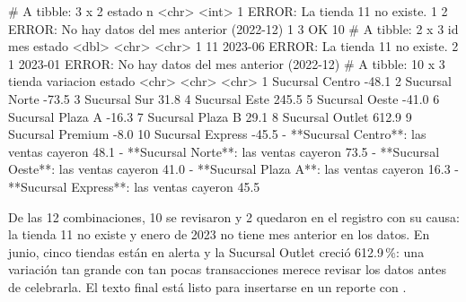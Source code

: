 \begin{rsalida}
# A tibble: 3 x 2
  estado                                             n
  <chr>                                          <int>
1 ERROR: La tienda 11 no existe.                     1
2 ERROR: No hay datos del mes anterior (2022-12)     1
3 OK                                                10
# A tibble: 2 x 3
     id mes     estado                                        
  <dbl> <chr>   <chr>                                         
1    11 2023-06 ERROR: La tienda 11 no existe.                
2     1 2023-01 ERROR: No hay datos del mes anterior (2022-12)
# A tibble: 10 x 3
   tienda           variacion estado            
   <chr>            <chr>     <chr>             
 1 Sucursal Centro  -48.1%
 2 Sucursal Norte   -73.5%
 3 Sucursal Sur     31.8%
 4 Sucursal Este    245.5%
 5 Sucursal Oeste   -41.0%
 6 Sucursal Plaza A -16.3%
 7 Sucursal Plaza B 29.1%
 8 Sucursal Outlet  612.9%
 9 Sucursal Premium -8.0%
10 Sucursal Express -45.5%
- **Sucursal Centro**: las ventas cayeron 48.1%
- **Sucursal Norte**: las ventas cayeron 73.5%
- **Sucursal Oeste**: las ventas cayeron 41.0%
- **Sucursal Plaza A**: las ventas cayeron 16.3%
- **Sucursal Express**: las ventas cayeron 45.5%
\end{rsalida}

De las 12 combinaciones, 10 se revisaron y 2 quedaron en el registro con su
causa: la tienda 11 no existe y enero de 2023 no tiene mes anterior en los
datos. En junio, cinco tiendas están en alerta y la Sucursal Outlet creció
612.9\,\%: una variación tan grande con tan pocas transacciones merece
revisar los datos antes de celebrarla. El texto final está listo para
insertarse en un reporte con .


